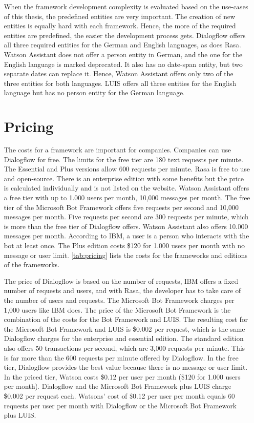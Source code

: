 When the framework development complexity is evaluated based on the use-cases of this thesis, the predefined entities are very important.
The creation of new entities is equally hard with each framework.
Hence, the more of the required entities are predefined, the easier the development process gets.
Dialogflow offers all three required entities for the German and English languages, as does Rasa.
Watson Assistant does not offer a person entity in German, and the one for the English language is marked deprecated.
It also has no date-span entity, but two separate dates can replace it.
Hence, Watson Assistant offers only two of the three entities for both languages. 
LUIS offers all three entities for the English language but has no person entity for the German language. 

\section*{Pricing} \label{sec:pricing}
The costs for a framework are important for companies.
Companies can use Dialogflow for free.
The limits for the free tier are 180 text requests per minute.
The Essential and Plus versions allow 600 requests per minute.
Rasa is free to use and open-source.
There is an enterprise edition with some benefits but the price
is calculated individually and is not listed on the website.
Watson Assistant offers a free tier with up to 1.000 users per month, 
10,000 messages per month.
The free tier of the Microsoft Bot Framework offers five requests per second and 10,000 messages per month. 
Five requests per second are 300 requests per minute, which is more than the free tier of Dialogflow offers.
Watson Assistant also offers 10.000 messages per month.
According to IBM, a user is a person who interacts with the bot at least once.
The Plus edition costs \$120 for 1.000 users per month with
no message or user limit.
\ref{tab:pricing} lists the costs for the frameworks and editions of the frameworks.

The price of Dialogflow is based on the number of requests, IBM offers a fixed number of requests and users, and with Rasa, the developer has to take care of the number of users and requests.
The Microsoft Bot Framework charges per 1,000 users like IBM does.
The price of the Microsoft Bot Framework is the combination of the costs for the Bot Framework and LUIS.
The resulting cost for the Microsoft Bot Framework and LUIS is \$0.002 per request, which is the same Dialogflow charges for the enterprise and essential edition.  
The standard edition also offers 50 transactions per second, which are 3,000 requests per minute.
This is far more than the 600 requests per minute offered by Dialogflow.
In the free tier, Dialogflow provides the best value because there is no message or user limit.
In the priced tier, Watson costs \$0.12 per user per month (\$120 for 1.000 users per month).
Dialogflow and the Microsoft Bot Framework plus LUIS charge \$0.002 per request each.
Watsons' cost of \$0.12 per user per month equals 60 requests per user per month with Dialogflow or the Microsoft Bot Framework plus LUIS.


